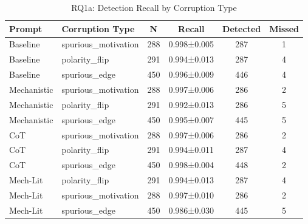 \begin{table}[htbp]
\centering
\caption{RQ1a: Detection Recall by Corruption Type}
\label{tab:rq1a_corruption_type}
\begin{tabular}{llcccc}
\toprule
\textbf{Prompt} & \textbf{Corruption Type} & \textbf{N} & \textbf{Recall} & \textbf{Detected} & \textbf{Missed} \\
\midrule
Baseline & spurious_motivation & 288 & 0.998±0.005 & 287 & 1 \\
Baseline & polarity_flip & 291 & 0.994±0.013 & 287 & 4 \\
Baseline & spurious_edge & 450 & 0.996±0.009 & 446 & 4 \\
Mechanistic & spurious_motivation & 288 & 0.997±0.006 & 286 & 2 \\
Mechanistic & polarity_flip & 291 & 0.992±0.013 & 286 & 5 \\
Mechanistic & spurious_edge & 450 & 0.995±0.007 & 445 & 5 \\
CoT & spurious_motivation & 288 & 0.997±0.006 & 286 & 2 \\
CoT & polarity_flip & 291 & 0.994±0.011 & 287 & 4 \\
CoT & spurious_edge & 450 & 0.998±0.004 & 448 & 2 \\
Mech-Lit & polarity_flip & 291 & 0.994±0.013 & 287 & 4 \\
Mech-Lit & spurious_motivation & 288 & 0.997±0.010 & 286 & 2 \\
Mech-Lit & spurious_edge & 450 & 0.986±0.030 & 445 & 5 \\
\bottomrule
\end{tabular}
\end{table}
